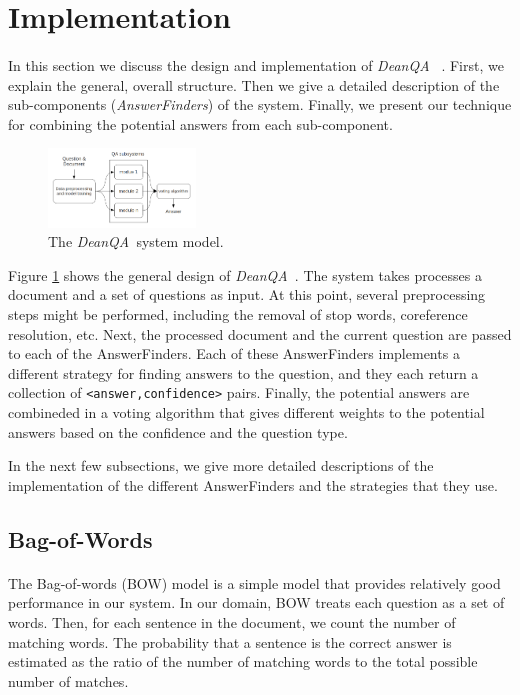 \documentclass[11pt,letterpaper]{article}
\newcommand{\name}{\emph{DeanQA~}}
\begin{document}
\section{Implementation}
\label{sec:implementation}
\paragraph{}
In this section we discuss the design and implementation of \name
. First, we explain the general, overall structure. Then we give
a detailed description of the sub-components (\emph{AnswerFinders}) of
the system. Finally, we present our technique for combining the
potential answers from each sub-component.

\begin{figure} 
	\centering
	\includegraphics[width=0.35\textwidth]{model.png}
	\caption{The \name system model.}
	\label{fig:model}
\end{figure}

Figure \ref{fig:model} shows the general design of \name.
The system takes processes a document and a set of questions as input.
At this point, several preprocessing steps might be performed,
including the removal of stop words, coreference resolution, etc.
Next, the processed document and the current question are passed to
each of the AnswerFinders. Each of these AnswerFinders implements a
different strategy for finding answers to the question, and they
each return a collection of \texttt{<answer,confidence>} pairs.
Finally, the potential answers are combineded in a voting algorithm
that gives different weights to the potential answers based on the
confidence and the question type.

In the next few subsections, we give more detailed descriptions of
the implementation of the different AnswerFinders and the
strategies that they use.

\subsection{Bag-of-Words}
\paragraph{}
The Bag-of-words (BOW) model is a simple model that provides
relatively good performance in our system. In our domain, BOW treats
each question as a set of words. Then, for each sentence in the
document, we count the number of matching words. The probability that
a sentence is the correct answer is estimated as the ratio of the
number of matching words to the total possible number of matches.
\end{document}
